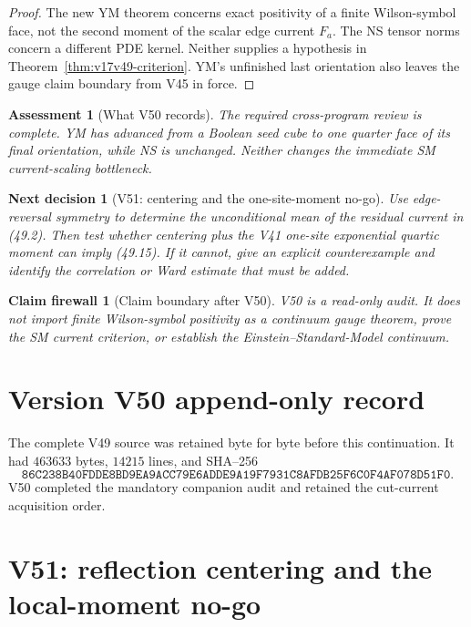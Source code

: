 \documentclass[11pt]{article}
\newtheorem{firewall}[theorem]{Claim firewall}
\newtheorem{decision}[theorem]{Next decision}
\newtheorem{assessment}[theorem]{Assessment}
\theoremstyle{remark}
\begin{document}
\begin{proof}
The new YM theorem concerns exact positivity of a finite Wilson-symbol
face, not the second moment of the scalar edge current \(F_a\).  The
NS tensor norms concern a different PDE kernel.  Neither supplies a
hypothesis in Theorem~\ref{thm:v17v49-criterion}.  YM's unfinished
last orientation also leaves the gauge claim boundary from V45 in
force.
\end{proof}

\begin{assessment}[What V50 records]
\label{ass:v17v50-status}
The required cross-program review is complete.  YM has advanced from a
Boolean seed cube to one quarter face of its final orientation, while
NS is unchanged.  Neither changes the immediate SM current-scaling
bottleneck.
\end{assessment}

\begin{decision}[V51: centering and the one-site-moment no-go]
\label{dec:v17v50-next}
Use edge-reversal symmetry to determine the unconditional mean of the
residual current in (49.2).  Then test whether centering plus the V41
one-site exponential quartic moment can imply (49.15).  If it cannot,
give an explicit counterexample and identify the correlation or Ward
estimate that must be added.
\end{decision}

\begin{firewall}[Claim boundary after V50]
\label{fire:v17v50}
V50 is a read-only audit.  It does not import finite Wilson-symbol
positivity as a continuum gauge theorem, prove the SM current
criterion, or establish the Einstein--Standard-Model continuum.
\end{firewall}

\section*{Version V50 append-only record}
The complete V49 source was retained byte for byte before this
continuation.  It had \(463633\) bytes, \(14215\) lines, and SHA--256
\[
 \texttt{86C238B40FDDE8BD9EA9ACC79E6ADDE9A19F7931C8AFDB25F6C0F4AF078D51F0}.
\]
V50 completed the mandatory companion audit and retained the
cut-current acquisition order.


\section{V51: reflection centering and the local-moment no-go}
\label{sec:v17v51}
\end{document}
